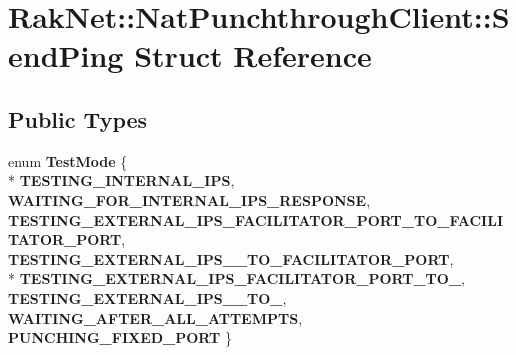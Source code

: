\hypertarget{struct_rak_net_1_1_nat_punchthrough_client_1_1_send_ping}{\section{Rak\-Net\-:\-:Nat\-Punchthrough\-Client\-:\-:Send\-Ping Struct Reference}
\label{struct_rak_net_1_1_nat_punchthrough_client_1_1_send_ping}
}
\subsection*{Public Types}
\begin{DoxyCompactItemize}
\item 
enum {\bfseries Test\-Mode} \{ \\*
{\bfseries T\-E\-S\-T\-I\-N\-G\-\_\-\-I\-N\-T\-E\-R\-N\-A\-L\-\_\-\-I\-P\-S}, 
{\bfseries W\-A\-I\-T\-I\-N\-G\-\_\-\-F\-O\-R\-\_\-\-I\-N\-T\-E\-R\-N\-A\-L\-\_\-\-I\-P\-S\-\_\-\-R\-E\-S\-P\-O\-N\-S\-E}, 
{\bfseries T\-E\-S\-T\-I\-N\-G\-\_\-\-E\-X\-T\-E\-R\-N\-A\-L\-\_\-\-I\-P\-S\-\_\-\-F\-A\-C\-I\-L\-I\-T\-A\-T\-O\-R\-\_\-\-P\-O\-R\-T\-\_\-\-T\-O\-\_\-\-F\-A\-C\-I\-L\-I\-T\-A\-T\-O\-R\-\_\-\-P\-O\-R\-T}, 
{\bfseries T\-E\-S\-T\-I\-N\-G\-\_\-\-E\-X\-T\-E\-R\-N\-A\-L\-\_\-\-I\-P\-S\-\_\-\_\-\-T\-O\-\_\-\-F\-A\-C\-I\-L\-I\-T\-A\-T\-O\-R\-\_\-\-P\-O\-R\-T}, 
\\*
{\bfseries T\-E\-S\-T\-I\-N\-G\-\_\-\-E\-X\-T\-E\-R\-N\-A\-L\-\_\-\-I\-P\-S\-\_\-\-F\-A\-C\-I\-L\-I\-T\-A\-T\-O\-R\-\_\-\-P\-O\-R\-T\-\_\-\-T\-O\-\_}, 
{\bfseries T\-E\-S\-T\-I\-N\-G\-\_\-\-E\-X\-T\-E\-R\-N\-A\-L\-\_\-\-I\-P\-S\-\_\-\_\-\-T\-O\-\_}, 
{\bfseries W\-A\-I\-T\-I\-N\-G\-\_\-\-A\-F\-T\-E\-R\-\_\-\-A\-L\-L\-\_\-\-A\-T\-T\-E\-M\-P\-T\-S}, 
{\bfseries P\-U\-N\-C\-H\-I\-N\-G\-\_\-\-F\-I\-X\-E\-D\-\_\-\-P\-O\-R\-T}
 \}
\end{DoxyCompactItemize}

